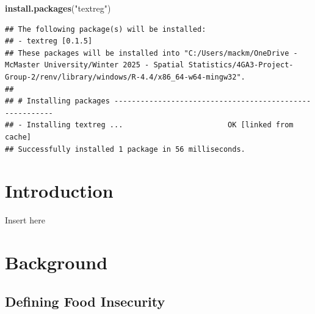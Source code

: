 \documentclass[]{article}
\newenvironment{Shaded}{\begin{snugshade}}{\end{snugshade}}
\newcommand{\FunctionTok}[1]{\textcolor[rgb]{0.13,0.29,0.53}{\textbf{#1}}}
\newcommand{\NormalTok}[1]{#1}
\newcommand{\StringTok}[1]{\textcolor[rgb]{0.31,0.60,0.02}{#1}}
\begin{document}
\vskip -8.5pt



\noindent  

\begin{Shaded}
\begin{Highlighting}[]
\FunctionTok{install.packages}\NormalTok{(}\StringTok{"textreg"}\NormalTok{)}
\end{Highlighting}
\end{Shaded}

\begin{verbatim}
## The following package(s) will be installed:
## - textreg [0.1.5]
## These packages will be installed into "C:/Users/mackm/OneDrive - McMaster University/Winter 2025 - Spatial Statistics/4GA3-Project-Group-2/renv/library/windows/R-4.4/x86_64-w64-mingw32".
## 
## # Installing packages --------------------------------------------------------
## - Installing textreg ...                        OK [linked from cache]
## Successfully installed 1 package in 56 milliseconds.
\end{verbatim}

\section{Introduction}\label{introduction}

Insert here

\section{Background}\label{background}

\subsection{Defining Food Insecurity}\label{defining-food-insecurity}
\end{document}
